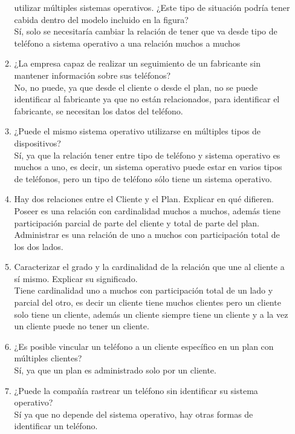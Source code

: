 \documentclass[a4paper, 12pt]{report}
\begin{document}
\begin{enumerate}
\begin{enumerate}
			utilizar múltiples sistemas operativos. ¿Este tipo de 
			situación podría tener cabida dentro del modelo incluido
			en la figura?\\
			Sí, solo se necesitaría cambiar la relación de tener que va
			desde tipo de teléfono a sistema operativo a una relación
			muchos a muchos
			\item ¿La empresa capaz de realizar un seguimiento de un 
			fabricante sin mantener información sobre sus teléfonos?\\
			No, no puede, ya que desde el cliente o desde el plan, 
			no se puede identificar al fabricante ya que no están
			relacionados, para identificar el fabricante, se necesitan 
			los datos del teléfono.	
			\item ¿Puede el mismo sistema operativo utilizarse en 
			múltiples tipos de dispositivos?\\
			Sí, ya que la relación tener entre tipo de teléfono y 
			sistema operativo es muchos a uno, es decir, un sistema 
			operativo puede estar en varios tipos de teléfonos, pero
			un tipo de teléfono sólo tiene un sistema operativo.
			\item Hay dos relaciones entre el Cliente y el Plan. Explicar en qué difieren.\\
			Poseer es una relación con cardinalidad muchos a muchos, 
			además tiene participación parcial de parte del cliente y
			total de parte del plan.\\
			Administrar es una relación de uno a muchos con 
			participación total de los dos lados.
			\item Caracterizar el grado y la cardinalidad de la 
			relación que une al cliente a sí mismo. Explicar su 
			significado.\\
			Tiene cardinalidad uno a muchos con participación total de
			un lado y parcial del otro, es decir un cliente tiene muchos clientes pero un cliente solo tiene un cliente,
			además un cliente siempre tiene un cliente y a la vez un 
			cliente puede no tener un cliente. 
			\item ¿Es posible vincular un teléfono a un cliente 
			específico en un plan con múltiples clientes?\\
			Sí, ya que un plan es administrado solo por un cliente.
			\item ¿Puede la compañía rastrear un teléfono sin identificar su sistema operativo?\\
			Sí ya que no depende del sistema operativo, hay otras 
			formas de identificar un teléfono.
			
		\end{enumerate}
		
	\end{enumerate}
\end{document}
